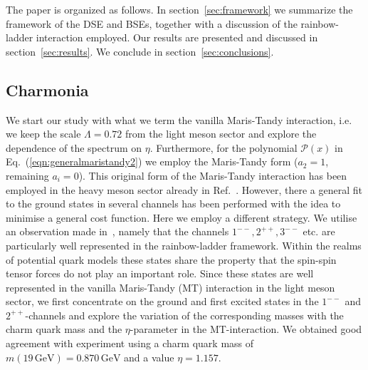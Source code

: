 The paper is organized as follows. In section~\ref{sec:framework} we summarize 
the framework of the DSE and BSEs, together with a discussion of the rainbow-ladder 
interaction employed. Our results are presented and discussed in section~\ref{sec:results}. 
We conclude in section~\ref{sec:conclusions}.

\subsection{Charmonia}\label{sec:charm}

%
%
%
%
%
%
We start our study with what we term the vanilla Maris-Tandy interaction,
i.e. we keep the scale $\Lambda=0.72$ from the light meson sector and
explore the dependence of the spectrum on $\eta$. Furthermore, for the
polynomial $\mathcal{P}(x)$ in Eq.~(\ref{eqn:generalmaristandy2}) we 
employ the Maris-Tandy form ($a_2 = 1$, remaining $a_i =0$).
This original form of the Maris-Tandy interaction has been employed in the
heavy meson sector already in Ref.~\cite{Blank:2011ha}. However, there a general
fit to the ground states in several channels has been performed with the idea 
to minimise a general cost function. Here we employ a different strategy.
We utilise an observation made in~\cite{Fischer:2014xha}, namely that the channels 
$1^{--}, 2^{++},3^{--}$ etc. are particularly well represented in the 
rainbow-ladder framework. Within the realms of potential quark models these
states share the property that the spin-spin tensor forces do not play an 
important role. Since these states are well represented in the vanilla
Maris-Tandy (MT) interaction in the light meson sector, we first concentrate
on the ground and first excited states in the $1^{--}$ and $2^{++}$-channels
and explore the variation of the corresponding masses with the charm quark
mass and the $\eta$-parameter in the MT-interaction. We obtained good
agreement with experiment using a charm quark mass of 
$m(19 \,\mbox{GeV}) = 0.870 \,\mbox{GeV}$ and a value $\eta=1.157$.

